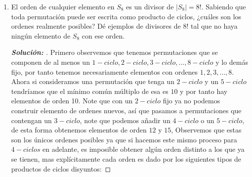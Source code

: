 \documentclass[12pt]{article}
\begin{document}
\begin{enumerate}
\begin{proof}[\textbf{Solución: }]
 \begin{equation*}
     \sigma(i)=\begin{cases}
     2i-1 & \text{Si } i\in\{1,2,\dots,26\}\\
     2(i-26)& \text{Si } i\in\{27,28,\dots,52\}
     \end{cases}
 \end{equation*}
 Ya con esto podemos ver los ciclos:
 \begin{align*}
     &1\to1\\
     &2\to3\to5\to9\to17\to33\to14\to27\to2\\
     &4\to7\to13\to25\to49\to46\to40\to28\to4\\
     &6\to11\to21\to41\to30\to8\to15\to29\to6\\
     &10\to19\to37\to22\to43\to34\to16\to31\to10\\
     &12\to23\to45\to38\to24\to47\to42\to32\to12\\
     &18\to35\to18\\
     &20\to39\to26\to51\to50\to48\to44\to36\to20\\
     &52\to52
 \end{align*}
 Por lo que en notación cíclica es
\begin{align*}
    \sigma=&(1)(2,3,5,9,17,33,14,27)(4,7,13,25,49,46,40,28)\\
    &(6,11,21,41,30,8,15,29)(10,19,37,22,43,34,16,31)\\
    &(12,23,45,38,24,47,42,32)(18,35)(20,39,26,51,50,48,44,36)(52)
\end{align*}
Observamos que $\sigma$ esta compuesta por dos $1-ciclos$, un $2-ciclo$ y seis $8-ciclos$ luego tenemos que $|\sigma|=\text{mcm}(1,2,8)=8$, es decir que se requiere hacer este procedimiento 8 veces para volver a la posición original.
\end{proof}
\item El orden de cualquier elemento en $S_8$ es un divisor de $|S_8|=8!$. Sabiendo que toda permutación puede ser escrita como producto de ciclos, ¿cuáles son los ordenes realmente posibles? Dé ejemplos de divisores de $8!$ tal que no haya ningún elemento de $S_8$ con ese orden.
\begin{proof}[\textbf{Solución: }] Primero observemos que tenemos permutaciones que se componen de al menos un $1-ciclo,2-ciclo,3-ciclo,\dots,8-ciclo$ y lo demás fijo, por tanto tenemos necesariamente elementos con ordenes $1,2,3,\dots,8$. Ahora si consideramos una permutación que tenga un $2-ciclo$ y un $5-ciclo$ tendríamos que el mínimo común múltiplo de esa es $10$ y por tanto hay elementos de orden 10. Note que con un $2-ciclo$ fijo ya no podemos construir elemento de ordenes nuevos, así que pasamos a permutaciones que contengan un $3-ciclo$, note que podemos añadir un $4-ciclo$ o un $5-ciclo$, de esta forma obtenemos elementos de orden $12$ y $15$, Observemos que estas son los únicos ordenes posibles ya que si hacemos este mismo proceso para $4-ciclos$ en adelante, es imposible obtener algún orden distinto a los que ya se tienen, mas explícitamente cada orden es dado por los siguientes tipos de productos de ciclos disyuntos:

\end{proof}
\end{enumerate}
\end{document}
